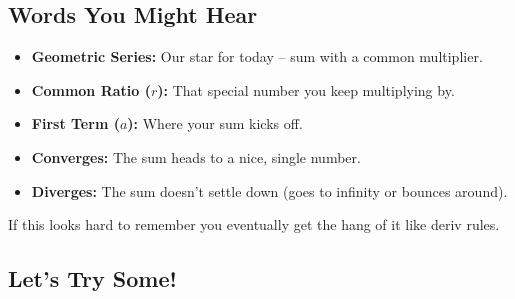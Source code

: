 \documentclass{article}
\begin{document}
\subsection*{Words You Might Hear}
\begin{itemize}
    \item \textbf{Geometric Series:} Our star for today – sum with a common multiplier.
    \item \textbf{Common Ratio (\(r\)):} That special number you keep multiplying by.
    \item \textbf{First Term (\(a\)):} Where your sum kicks off.
    \item \textbf{Converges:} The sum heads to a nice, single number.
    \item \textbf{Diverges:} The sum doesn't settle down (goes to infinity or bounces around).
\end{itemize}
If this looks hard to remember you eventually get the hang of it like deriv rules.

\subsection*{Let's Try Some!}
\end{document}
